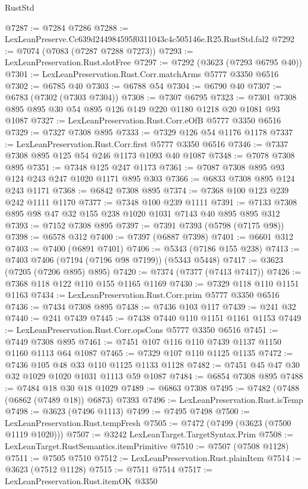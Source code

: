 \begin{lexlean}{RustStd}
\begin{coremodule}
@7287 := @7284 @7286
@7288 := LexLeanPreserve.Cc639d244984595f0311043c4c505146e.R25.RustStd.fal2
@7292 := @7074 (@7083 (@7287 @7288 @7273))
@7293 := LexLeanPreservation.Rust.slotFree
@7297 := @7292 (@3623 (@7293 @6795 @40))
@7301 := LexLeanPreservation.Rust.Corr.matchArms @5777 @3350 @6516
@7302 := @6785 @40
@7303 := @6788 @54
@7304 := @6790 @40
@7307 := @6783 (@7302 (@7303 @7304))
@7308 := @7307 @6795
@7323 := @7301 @7308 @895 @895 @30 @54 @895 @126 @149 @220 @1180 @1218 @20 @1081 @93 @1087
@7327 := LexLeanPreservation.Rust.Corr.eOfB @5777 @3350 @6516
@7329 := @7327 @7308 @895
@7333 := @7329 @126 @54 @1176 @1178
@7337 := LexLeanPreservation.Rust.Corr.first @5777 @3350 @6516
@7346 := @7337 @7308 @895 @125 @54 @246 @1173 @1093 @40 @1087
@7348 := @7078 @7308 @895
@7351 := @7348 @125 @247 @1173
@7361 := @7087 @7308 @895 @93 @124 @243 @247 @1020 @1171 @895 @303
@7366 := @6833 @7308 @895 @124 @243 @1171
@7368 := @6842 @7308 @895
@7374 := @7368 @100 @123 @239 @242 @1111 @1170
@7377 := @7348 @100 @239 @1111
@7391 := @7133 @7308 @895 @98 @47 @32 @155 @238 @1020 @1031 @7143 @40 @895 @895 @312
@7393 := @7152 @7308 @895
@7397 := @7391 @7393 (@5798 (@7175 @98))
@7398 := @6578 @312
@7400 := @7397 (@6887 @7398)
@7401 := @6601 @312
@7403 := @7400 (@6891 @7401)
@7406 := @5343 (@7186 @155 @238)
@7413 := @7403 @7406 (@7194 (@7196 @98 @7199)) (@5343 @5448)
@7417 := @3623 (@7205 (@7206 @895) @895)
@7420 := @7374 (@7377 (@7413 @7417))
@7426 := @7368 @118 @122 @110 @155 @1165 @1169
@7430 := @7329 @118 @110 @1151 @1163
@7434 := LexLeanPreservation.Rust.Corr.prim @5777 @3350 @6516
@7436 := @7434 @7308 @895
@7438 := @7436 @103 @117
@7439 := @241 @32
@7440 := @241 @7439
@7445 := @7438 @7440 @110 @1151 @1161 @1153
@7449 := LexLeanPreservation.Rust.Corr.opsCons @5777 @3350 @6516
@7451 := @7449 @7308 @895
@7461 := @7451 @107 @116 @110 @7439 @1137 @1150 @1160 @1113 @64 @1087
@7465 := @7329 @107 @110 @1125 @1135
@7472 := @7436 @105 @48 @33 @110 @1125 @1133 @1128
@7482 := @7451 @45 @47 @30 @32 @1029 @1020 @1031 @1113 @59 @1087
@7484 := @6854 @7308 @895
@7488 := @7484 @18 @30 @18 @1029
@7489 := @6863 @7308
@7495 := @7482 (@7488 (@6862 (@7489 @18)) @6873) @7393
@7496 := LexLeanPreservation.Rust.isTemp
@7498 := @3623 (@7496 @1113)
@7499 := @7495 @7498
@7500 := LexLeanPreservation.Rust.tempFresh
@7505 := @7472 (@7499 (@3623 (@7500 @1119 @1020)))
@7507 := @3242 LexLeanTarget.TargetSyntax.Prim
@7508 := LexLeanTarget.RustSemantics.itemPrimitive
@7510 := @7507 (@7508 @1128)
@7511 := @7505 @7510
@7512 := LexLeanPreservation.Rust.plainItem
@7514 := @3623 (@7512 @1128)
@7515 := @7511 @7514
@7517 := LexLeanPreservation.Rust.itemOK @3350

\end{coremodule}
\end{lexlean}
